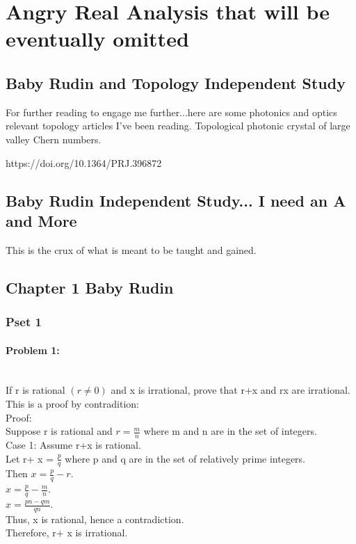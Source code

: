 \chapter{Angry Real Analysis that will be eventually omitted}



\section{Baby Rudin and Topology Independent Study}

For further reading to engage me further...here are some photonics and optics relevant topology articles I've been reading. Topological photonic crystal of large valley Chern numbers. 

https://doi.org/10.1364/PRJ.396872



\section[Baby Rudin]{Baby Rudin Independent Study... I need an A and More}
This is the crux of what is meant to be taught and gained. 

\section{Chapter 1 Baby Rudin}


\newpage

\subsection{Pset 1}


\subsubsection*{Problem 1:} \\ 
If r is rational $(r \neq 0)$ and x is irrational, prove that r+x and rx are irrational. \\ 




This is a proof by contradition: \\


Proof: 
\\
Suppose r is rational and $r=\frac{m}{n}$ where m and n are in the set of integers.   \\
Case 1: 
Assume r+x is rational. \\ 
Let r+ x = $\frac{p}{q}$ where p and q are in the set of relatively prime integers.\\ 
Then $x= \frac{p}{q}-r.$ \\ 
$x=\frac{p}{q}-\frac{m}{n}.$ \\ 
$x= \frac{pn-qm}{qn}.$ \\ 
Thus, x is rational, hence a contradiction. \\
Therefore, r+ x is irrational.  \\ 

